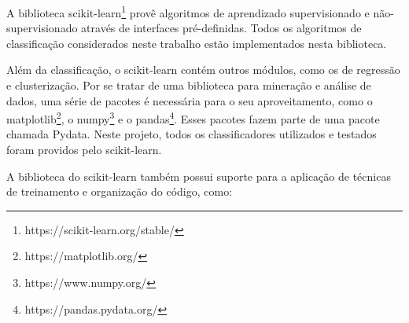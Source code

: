 A biblioteca scikit-learn\footnote{https://scikit-learn.org/stable/} provê algoritmos de aprendizado supervisionado e não-supervisionado através de interfaces pré-definidas. Todos os algoritmos de classificação considerados neste trabalho estão implementados nesta biblioteca.

Além da classificação, o scikit-learn contém outros módulos, como os de regressão e clusterização. Por se tratar de uma biblioteca para mineração e análise de dados, uma série de pacotes é necessária para o seu aproveitamento, como o matplotlib\footnote{https://matplotlib.org/}, o numpy\footnote{https://www.numpy.org/} e o pandas\footnote{https://pandas.pydata.org/}. Esses pacotes fazem parte de uma pacote chamada Pydata. Neste projeto, todos os classificadores utilizados e testados foram providos pelo scikit-learn.

A biblioteca do scikit-learn também possui suporte para a aplicação de técnicas de treinamento e organização do código, como:

